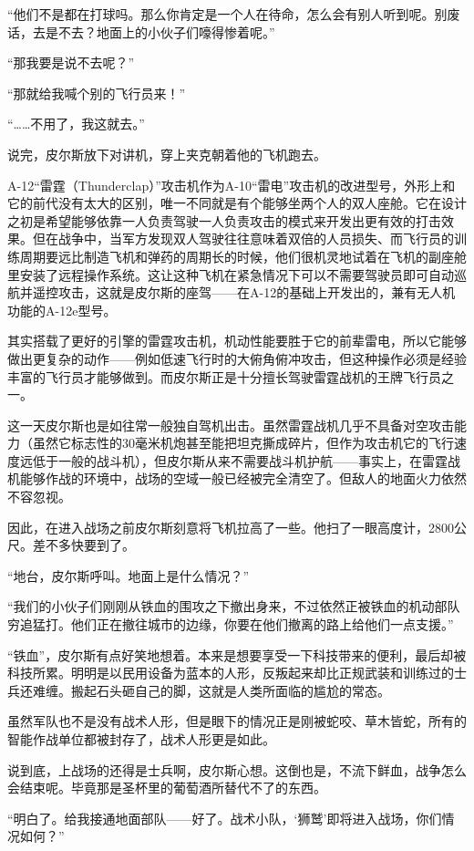 “他们不是都在打球吗。那么你肯定是一个人在待命，怎么会有别人听到呢。别废话，去是不去？地面上的小伙子们嚎得惨着呢。”

“那我要是说不去呢？”

“那就给我喊个别的飞行员来！”

“……不用了，我这就去。”

说完，皮尔斯放下对讲机，穿上夹克朝着他的飞机跑去。

A-12“雷霆（Thunderclap）”攻击机作为A-10“雷电”攻击机的改进型号，外形上和它的前代没有太大的区别，唯一不同就是有个能够坐两个人的双人座舱。它在设计之初是希望能够依靠一人负责驾驶一人负责攻击的模式来开发出更有效的打击效果。但在战争中，当军方发现双人驾驶往往意味着双倍的人员损失、而飞行员的训练周期要远比制造飞机和弹药的周期长的时候，他们很机灵地试着在飞机的副座舱里安装了远程操作系统。这让这种飞机在紧急情况下可以不需要驾驶员即可自动巡航并遥控攻击，这就是皮尔斯的座驾——在A-12的基础上开发出的，兼有无人机功能的A-12e型号。

其实搭载了更好的引擎的雷霆攻击机，机动性能要胜于它的前辈雷电，所以它能够做出更复杂的动作——例如低速飞行时的大俯角俯冲攻击，但这种操作必须是经验丰富的飞行员才能够做到。而皮尔斯正是十分擅长驾驶雷霆战机的王牌飞行员之一。

这一天皮尔斯也是如往常一般独自驾机出击。虽然雷霆战机几乎不具备对空攻击能力（虽然它标志性的30毫米机炮甚至能把坦克撕成碎片，但作为攻击机它的飞行速度远低于一般的战斗机），但皮尔斯从来不需要战斗机护航——事实上，在雷霆战机能够作战的环境中，战场的空域一般已经被完全清空了。但敌人的地面火力依然不容忽视。

因此，在进入战场之前皮尔斯刻意将飞机拉高了一些。他扫了一眼高度计，2800公尺。差不多快要到了。

“地台，皮尔斯呼叫。地面上是什么情况？”

“我们的小伙子们刚刚从铁血的围攻之下撤出身来，不过依然正被铁血的机动部队穷追猛打。他们正在撤往城市的边缘，你要在他们撤离的路上给他们一点支援。”

“铁血”，皮尔斯有点好笑地想着。本来是想要享受一下科技带来的便利，最后却被科技所累。明明是以民用设备为蓝本的人形，反叛起来却比正规武装和训练过的士兵还难缠。搬起石头砸自己的脚，这就是人类所面临的尴尬的常态。

虽然军队也不是没有战术人形，但是眼下的情况正是刚被蛇咬、草木皆蛇，所有的智能作战单位都被封存了，战术人形更是如此。

说到底，上战场的还得是士兵啊，皮尔斯心想。这倒也是，不流下鲜血，战争怎么会结束呢。毕竟那是圣杯里的葡萄酒所替代不了的东西。

“明白了。给我接通地面部队——好了。战术小队，‘狮鹫’即将进入战场，你们情况如何？”

